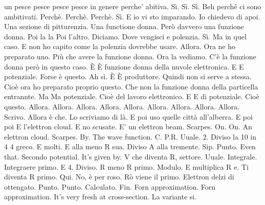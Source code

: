 \begin{soluzione}
{un pesce pesce pesce pesce in genere perche' abitiva. Sì. Sì. Sì. Beh perché ci sono ambitivati. Perchè. Perchè. Perchè. Sì. E io vi sto imparando. Io chiedevo di apoi. Una sezione di pitturenzia. Una functione donna. Però davvero una funzione donna. Poi la la Poi l'altro. Diciamo. Dove vengisci e polenzia. Sì. Ma in quel caso. E non ho capito come la polenzia dovrebbe usare. Allora. Ora ne ho preparato uno. Più che avere la funzione donna. Ora la vediamo. C'è la funzione donna però in questo caso. È È funzione donna della nuvole elettronica. E E potenziale. Forse è questo. Ah sì. È È produttore. Quindi non si serve a stessa. Cioè ora ho preparato proprio questo. Che non la funzione donna della particella entrannte. Ma Ma potenziale. Cioè del lavoro elettronico. E E di potenziale. Cioè questo. Allora. Allora. Allora. Allora. Allora. Allora. Allora. Allora. Allora. Scrivo. Allora è che. Lo scriviamo di là. E poi uso quelle città all'alberra. E poi poi E l'elettron cloud. E no scusate. E' un elettron beam. Scarpes. On. On. An elettron cloud. Scarpes. By. The wave function. C. P.R. Uuale. 2. Diviso la 10 in 4 4 greco. E molti. E alla meno R sua. Diviso A alla tremente. Sip. Punto. Even that. Secondo potential. It's given by. V che diventa R, settore. Uuale. Integrale. Integraere primo. E 4. Diviso. R meno R primo. Modulo. E multiplica R e. Ti diventa R primo. Qui. No, è per roso. Rò viene il primo. Elettron delzi di ottengato. Punto. Punto. Calculato. Fin. Forn approximation. Forn approximation. It's very fresh at cross-section. La variante si. 
   
}
\end{soluzione}

